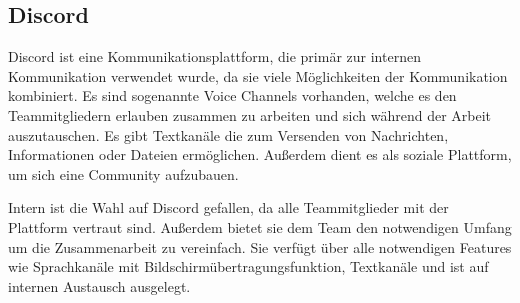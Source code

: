 \subsection{Discord}\label{subsec:Discord}
Discord ist eine Kommunikationsplattform, die primär zur internen Kommunikation verwendet wurde, da sie viele Möglichkeiten der Kommunikation kombiniert.
Es sind sogenannte Voice Channels vorhanden, welche es den Teammitgliedern erlauben zusammen zu arbeiten und sich während der Arbeit auszutauschen.
Es gibt Textkanäle die zum Versenden von Nachrichten, Informationen oder Dateien ermöglichen.
Außerdem dient es als soziale Plattform, um sich eine Community aufzubauen.

Intern ist die Wahl auf Discord gefallen, da alle Teammitglieder mit der Plattform vertraut sind.
Außerdem bietet sie dem Team den notwendigen Umfang um die Zusammenarbeit zu vereinfach.
Sie verfügt über alle notwendigen Features wie Sprachkanäle mit Bildschirmübertragungsfunktion, Textkanäle und ist auf internen Austausch ausgelegt.

%

\renewcommand{\kapitelautor}{}

